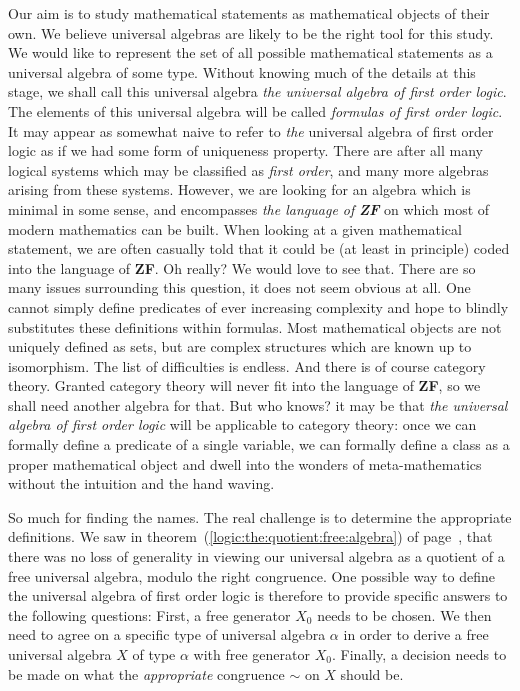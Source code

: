 Our aim is to study mathematical statements as mathematical objects
of their own. We believe universal algebras are likely to be the
right tool for this study. We would like to represent the set of all
possible mathematical statements as a universal algebra of some
type. Without knowing much of the details at this stage, we shall
call this universal algebra {\em the universal algebra of first
order logic}. The elements of this universal algebra will be called
{\em formulas of first order logic}. It may appear as somewhat naive
to refer to {\em the} universal algebra of first order logic as if
we had some form of uniqueness property. There are after all many
logical systems which may be classified as {\em first order}, and
many more algebras arising from these systems. However, we are
looking for an algebra which is minimal in some sense, and
encompasses {\em the language of {\bf ZF}} on which most of modern
mathematics can be built. When looking at a given mathematical
statement, we are often casually told that it could be (at least in
principle) coded into the language of {\bf ZF}. Oh really? We would
love to see that. There are so many issues surrounding this
question, it does not seem obvious at all. One cannot simply define
predicates of ever increasing complexity and hope to blindly
substitutes these definitions within formulas. Most mathematical
objects are not uniquely defined as sets, but are complex structures
which are known up to isomorphism. The list of difficulties is
endless. And there is of course category theory. Granted category
theory will never fit into the language of {\bf ZF}, so we shall
need another algebra for that. But who knows? it may be that {\em
the universal algebra of first order logic} will be applicable to
category theory: once we can formally define a predicate of a single
variable, we can formally define a class as a proper mathematical
object and dwell into the wonders of meta-mathematics without the
intuition and the hand waving.

So much for finding the names. The real challenge is to determine
the appropriate definitions. We saw in
theorem~(\ref{logic:the:quotient:free:algebra}) of
page~\pageref{logic:the:quotient:free:algebra}, that there was no
loss of generality in viewing our universal algebra as a quotient of
a free universal algebra, modulo the right congruence. One possible
way to define the universal algebra of first order logic is
therefore to provide specific answers to the following questions:
First, a free generator $X_{0}$ needs to be chosen. We then need to
agree on a specific type of universal algebra $\alpha$ in order to
derive a free universal algebra $X$ of type $\alpha$ with free
generator $X_{0}$. Finally, a decision needs to be made on what the
{\em appropriate} congruence $\sim$ on $X$ should be.

